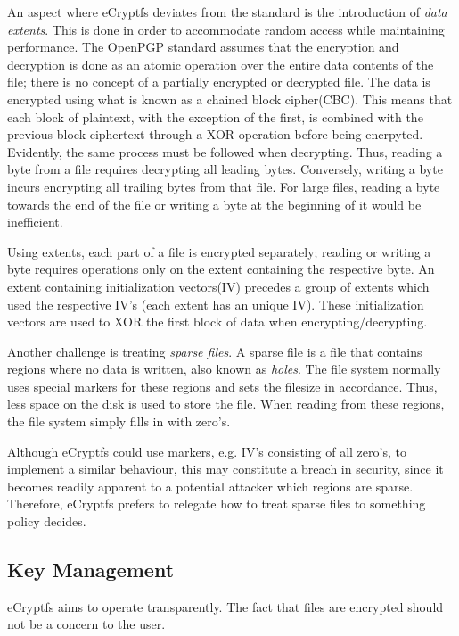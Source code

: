 An aspect where eCryptfs deviates from the standard is the introduction of \textit{data extents}. This is done in order to accommodate random access while maintaining performance. The OpenPGP standard assumes that the encryption and decryption is done as an atomic operation over the entire data contents of the file; there is no concept of a partially encrypted or decrypted file. The data is encrypted using what is known as a chained block cipher(CBC). This means that each block of plaintext, with the exception of the first, is combined with the previous block ciphertext through a XOR operation before being encrpyted. Evidently, the same process must be followed when decrypting. Thus, reading a byte from a file requires decrypting all leading bytes. Conversely, writing a byte incurs encrypting all trailing bytes from that file. For large files, reading a byte towards the end of the file or writing a byte at the beginning of it would be inefficient.

Using extents, each part of a file is encrypted separately; reading or writing a byte requires operations only on the extent containing the respective byte. An extent containing initialization vectors(IV) precedes a group of extents which used the respective IV's (each extent has an unique IV). These initialization vectors are used to XOR the first block of data when encrypting/decrypting.

Another challenge is treating \textit{sparse files}. A sparse file is a file that contains regions where no data is written, also known as \textit{holes}. The file system normally uses special markers for these regions and sets the filesize in accordance. Thus, less space on the disk is used to store the file. When reading from these regions, the file system simply fills in with zero's.

Although eCryptfs could use markers, e.g. IV's consisting of all zero's, to implement a similar behaviour, this may constitute a breach in security, since it becomes readily apparent to a potential attacker which regions are sparse.
Therefore, eCryptfs prefers to relegate how to treat sparse files to something policy decides.

\subsection{Key Management}
\label{sub-sec:keys-ecryptfs}

eCryptfs aims to operate transparently. The fact that files are encrypted should not be a concern to the user.

